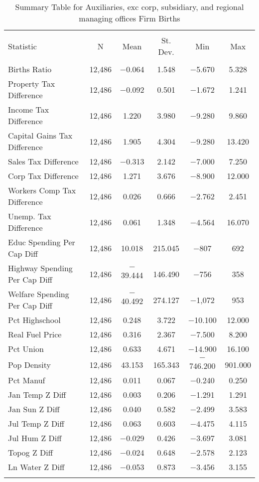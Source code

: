 
\begin{table}[!htbp] \centering 
  \caption{Summary Table for  Auxiliaries, exc corp, subsidiary, and regional managing offices Firm Births} 
  \label{95summary} 
\begin{tabular}{@{\extracolsep{5pt}}lccccc} 
\\[-1.8ex]\hline 
\hline \\[-1.8ex] 
Statistic & \multicolumn{1}{c}{N} & \multicolumn{1}{c}{Mean} & \multicolumn{1}{c}{St. Dev.} & \multicolumn{1}{c}{Min} & \multicolumn{1}{c}{Max} \\ 
\hline \\[-1.8ex] 
Births Ratio & 12,486 & $-$0.064 & 1.548 & $-$5.670 & 5.328 \\ 
Property Tax Difference & 12,486 & $-$0.092 & 0.501 & $-$1.672 & 1.241 \\ 
Income Tax Difference & 12,486 & 1.220 & 3.980 & $-$9.280 & 9.860 \\ 
Capital Gains Tax Difference & 12,486 & 1.905 & 4.304 & $-$9.280 & 13.420 \\ 
Sales Tax Difference & 12,486 & $-$0.313 & 2.142 & $-$7.000 & 7.250 \\ 
Corp Tax Difference & 12,486 & 1.271 & 3.676 & $-$8.900 & 12.000 \\ 
Workers Comp Tax Difference & 12,486 & 0.026 & 0.666 & $-$2.762 & 2.451 \\ 
Unemp. Tax Difference & 12,486 & 0.061 & 1.348 & $-$4.564 & 16.070 \\ 
Educ Spending Per Cap Diff & 12,486 & 10.018 & 215.045 & $-$807 & 692 \\ 
Highway Spending Per Cap Diff & 12,486 & $-$39.444 & 146.490 & $-$756 & 358 \\ 
Welfare Spending Per Cap Diff & 12,486 & $-$40.492 & 274.127 & $-$1,072 & 953 \\ 
Pct Highschool & 12,486 & 0.248 & 3.722 & $-$10.100 & 12.000 \\ 
Real Fuel Price & 12,486 & 0.316 & 2.367 & $-$7.500 & 8.200 \\ 
Pct Union & 12,486 & 0.633 & 4.671 & $-$14.900 & 16.100 \\ 
Pop Density & 12,486 & 43.153 & 165.343 & $-$746.200 & 901.000 \\ 
Pct Manuf & 12,486 & 0.011 & 0.067 & $-$0.240 & 0.250 \\ 
Jan Temp Z Diff & 12,486 & 0.003 & 0.206 & $-$1.291 & 1.291 \\ 
Jan Sun Z Diff & 12,486 & 0.040 & 0.582 & $-$2.499 & 3.583 \\ 
Jul Temp Z Diff & 12,486 & 0.063 & 0.603 & $-$4.475 & 4.115 \\ 
Jul Hum Z Diff & 12,486 & $-$0.029 & 0.426 & $-$3.697 & 3.081 \\ 
Topog Z Diff & 12,486 & $-$0.024 & 0.648 & $-$2.578 & 2.123 \\ 
Ln Water Z Diff & 12,486 & $-$0.053 & 0.873 & $-$3.456 & 3.155 \\ 
\hline \\[-1.8ex] 
\end{tabular} 
\end{table} 
